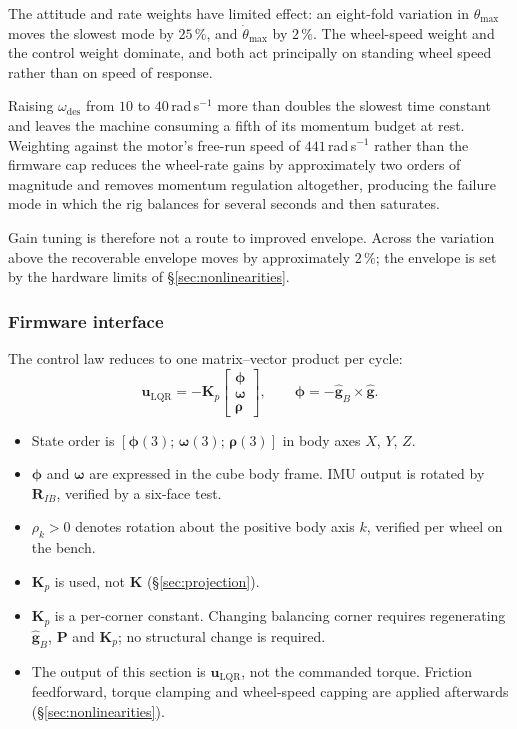 The attitude and rate weights have limited effect: an eight-fold variation in
$\theta_{\max}$ moves the slowest mode by $25\,\%$, and $\dot\theta_{\max}$
by $2\,\%$. The wheel-speed weight and the control weight dominate, and both
act principally on standing wheel speed rather than on speed of response.

Raising $\omega_{\mathrm{des}}$ from $10$ to $40$\,rad\,s$^{-1}$ more than
doubles the slowest time constant and leaves the machine consuming a fifth of
its momentum budget at rest. Weighting against the motor's free-run speed of
$441$\,rad\,s$^{-1}$ rather than the firmware cap reduces the wheel-rate
gains by approximately two orders of magnitude and removes momentum
regulation altogether, producing the failure mode in which the rig balances
for several seconds and then saturates.

Gain tuning is therefore not a route to improved envelope. Across the
variation above the recoverable envelope moves by approximately $2\,\%$; the
envelope is set by the hardware limits of \S\ref{sec:nonlinearities}.

\subsubsection{Firmware interface}
\label{sec:firmware-interface}

The control law reduces to one matrix--vector product per cycle:
%
\begin{equation}
  \bm{u}_{\mathrm{LQR}} = -\bm{K}_p
  \begin{bmatrix}\bm{\phi}\\ \bm{\omega}\\ \bm{\rho}\end{bmatrix},
  \qquad
  \bm{\phi} = -\hat{\bm{g}}_B\times\hat{\bm{g}} .
\end{equation}

\begin{itemize}
  \item State order is $[\bm{\phi}(3);\,\bm{\omega}(3);\,\bm{\rho}(3)]$ in
        body axes $X$, $Y$, $Z$.
  \item $\bm{\phi}$ and $\bm{\omega}$ are expressed in the cube body frame.
        IMU output is rotated by $\bm{R}_{IB}$, verified by a six-face test.
  \item $\rho_k > 0$ denotes rotation about the positive body axis $k$,
        verified per wheel on the bench.
  \item $\bm{K}_p$ is used, not $\bm{K}$ (\S\ref{sec:projection}).
  \item $\bm{K}_p$ is a per-corner constant. Changing balancing corner
        requires regenerating $\hat{\bm{g}}_B$, $\bm{P}$ and $\bm{K}_p$; no
        structural change is required.
  \item The output of this section is $\bm{u}_{\mathrm{LQR}}$, not the
        commanded torque. Friction feedforward, torque clamping and
        wheel-speed capping are applied afterwards
        (\S\ref{sec:nonlinearities}).
\end{itemize}

